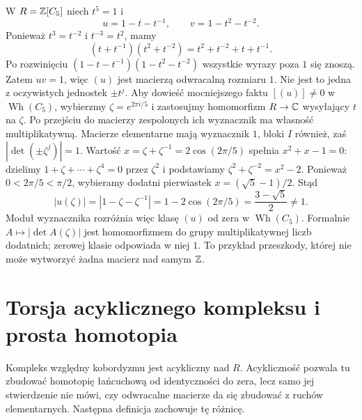 \begin{przyklad}
\label{prz:wh-c5-20}
W $R=\mathbb{Z}[C_5]$ niech $t^5=1$ i
\[
 u=1-t-t^{-1},\qquad v=1-t^2-t^{-2}.
\]
Ponieważ $t^3=t^{-2}$ i $t^{-3}=t^2$, mamy
\[
 (t+t^{-1})(t^2+t^{-2})=t^2+t^{-2}+t+t^{-1}.
\]
Po rozwinięciu $(1-t-t^{-1})(1-t^2-t^{-2})$ wszystkie
wyrazy poza $1$ się znoszą. Zatem $uv=1$,
więc $(u)$ jest macierzą odwracalną rozmiaru $1$.
Nie jest to jedna z oczywistych jednostek $\pm t^j$.
Aby dowieść mocniejszego faktu $[(u)]\ne0$ w
$\operatorname{Wh}(C_5)$, wybierzmy
$\zeta=e^{2\pi i/5}$ i zastosujmy homomorfizm
$R\to\mathbb{C}$ wysyłający $t$ na $\zeta$.
Po przejściu do macierzy zespolonych ich wyznacznik
ma własność multiplikatywną. Macierze elementarne
mają wyznacznik $1$, bloki $I$ również, zaś
$|\det(\pm\zeta^j)|=1$. Wartość
$x=\zeta+\zeta^{-1}=2\cos(2\pi/5)$ spełnia
$x^2+x-1=0$: dzielimy $1+\zeta+\cdots+\zeta^4=0$
przez $\zeta^2$ i podstawiamy $\zeta^2+\zeta^{-2}=x^2-2$.
Ponieważ $0<2\pi/5<\pi/2$, wybieramy dodatni pierwiastek
$x=(\sqrt5-1)/2$. Stąd
\[
 |u(\zeta)|=|1-\zeta-\zeta^{-1}|
 =1-2\cos(2\pi/5)=\frac{3-\sqrt5}{2}\ne1.
\]
Moduł wyznacznika rozróżnia więc klasę $(u)$
od zera w $\operatorname{Wh}(C_5)$.
Formalnie $A\mapsto|\det A(\zeta)|$ jest homomorfizmem
do grupy multiplikatywnej liczb dodatnich; zerowej klasie
odpowiada w niej $1$. To przykład
przeszkody, której nie może wytworzyć żadna macierz
nad samym $\mathbb{Z}$.
\end{przyklad}

\section{Torsja acyklicznego kompleksu i prosta homotopia}
\label{sec:torsja-kompleksu-20}

Kompleks względny kobordyzmu jest acykliczny nad $R$.
Acykliczność pozwala tu zbudować homotopię łańcuchową
od identyczności do zera, lecz samo jej stwierdzenie nie
mówi, czy odwracalne macierze da się zbudować z
ruchów elementarnych. Następna definicja zachowuje
tę różnicę.


